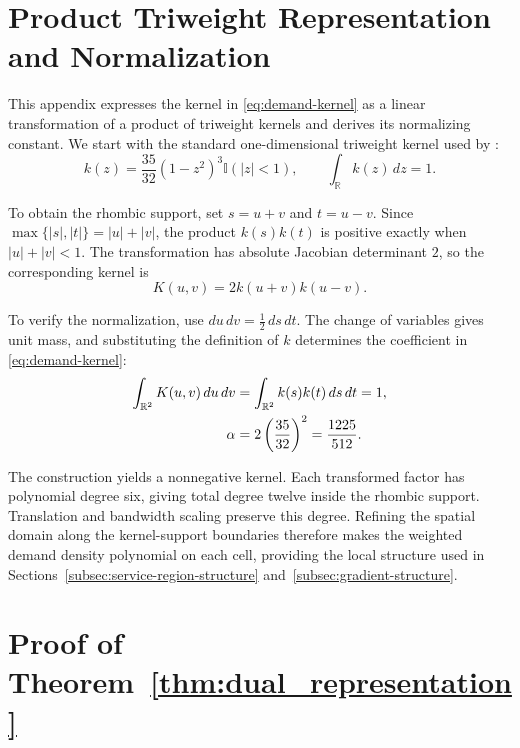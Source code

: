 \documentclass[a4paper,fleqn]{cas-sc}
\theoremstyle{remark}
\theoremstyle{plain}
\begin{document}
\section{Product Triweight Representation and Normalization}
\label{app:kernel_derivation}

This appendix expresses the kernel in \eqref{eq:demand-kernel} as a linear transformation of a product of triweight kernels and derives its normalizing constant. We start with the standard one-dimensional triweight kernel used by \citet{li2002structural}:
\[
    k(z)=\frac{35}{32}(1-z^2)^3\mathbb I(|z|<1),\qquad \int_{\mathbb R}k(z)\,dz=1.
\]

To obtain the rhombic support, set $s=u+v$ and $t=u-v$. Since $\max\{|s|,|t|\}=|u|+|v|$, the product $k(s)k(t)$ is positive exactly when $|u|+|v|<1$. The transformation has absolute Jacobian determinant $2$, so the corresponding kernel is
\begin{equation}\label{eq:app-product-triweight}
    K(u,v)=2k(u+v)k(u-v).
\end{equation}

To verify the normalization, use $du\,dv=\tfrac12\,ds\,dt$. The change of variables gives unit mass, and substituting the definition of $k$ determines the coefficient in \eqref{eq:demand-kernel}:
\begin{subequations}\label{eq:app-kernel-normalization}
\allowdisplaybreaks[0]
\begin{align}
    \int_{\mathbb R^2}K(u,v)\,du\,dv&=\int_{\mathbb R^2}k(s)k(t)\,ds\,dt=1,\label{eq:app-kernel-unit-mass}\\
    \alpha&=2\left(\frac{35}{32}\right)^2=\frac{1225}{512}.\label{eq:app-kernel-constant}
\end{align}
\end{subequations}

The construction yields a nonnegative kernel. Each transformed factor has polynomial degree six, giving total degree twelve inside the rhombic support. Translation and bandwidth scaling preserve this degree. Refining the spatial domain along the kernel-support boundaries therefore makes the weighted demand density polynomial on each cell, providing the local structure used in Sections~\ref{subsec:service-region-structure} and~\ref{subsec:gradient-structure}.


\section{Proof of Theorem~\ref{thm:dual_representation}}
\label{app:dual_proof}
\end{document}
